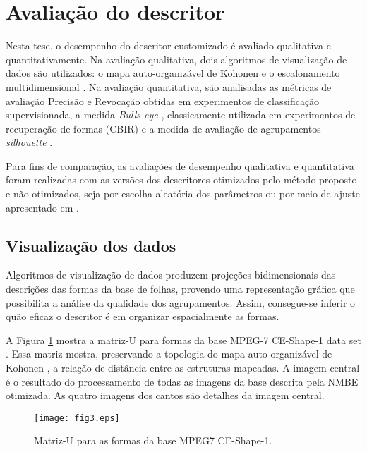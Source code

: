\section{Avaliação do descritor}

Nesta tese, o desempenho do descritor customizado é avaliado qualitativa e quantitativamente. Na avaliação qualitativa, dois algoritmos de visualização de dados são utilizados: o mapa auto-organizável de Kohonen \cite{Kohonen:2001} e o escalonamento multidimensional \cite{cox:2000}. Na avaliação quantitativa,  são analisadas as métricas de avaliação Precisão e Revocação \cite{Paula:2013} obtidas em experimentos de classificação supervisionada, a medida \textit{Bulls-eye} \cite{Alajlan20117,Ling:2007:SCU:1191552.1191806}, classicamente utilizada em experimentos de recuperação de formas (\ac{CBIR}) e a medida de avaliação de agrupamentos \textit{silhouette} \cite{Rousseeuw:1987}. 

Para fins de comparação,  as avaliações de desempenho qualitativa e quantitativa foram realizadas com as versões dos descritores otimizados pelo método proposto e não otimizados, seja por escolha aleatória dos parâmetros ou por meio de ajuste apresentado em \cite{Costa:1997}.

\subsection{Visualização dos dados}

Algoritmos de visualização de dados produzem projeções bidimensionais das descrições das formas da base de folhas, provendo uma representação gráfica que possibilita a análise da qualidade dos agrupamentos. Assim, consegue-se inferir o quão eficaz o descritor é em organizar espacialmente as formas.

A Figura \ref{fig:projkimia99} mostra a matriz-U \cite{Ultsch:1990} para formas da base MPEG-7 CE-Shape-1 data set \cite{855850}. Essa matriz mostra, preservando a topologia do mapa auto-organizável de Kohonen \cite{Kohonen:2001}, a relação de distância entre as estruturas mapeadas. A imagem central é o resultado do processamento de todas as imagens da base descrita pela \ac{NMBE} otimizada. As quatro imagens dos cantos são detalhes da imagem central. 

\begin{figure}[h]
\caption{\label{fig:projkimia99} Matriz-U para as formas da base MPEG7 CE-Shape-1.}
\centering
\texttt{[image: fig3.eps]}
\end{figure}


